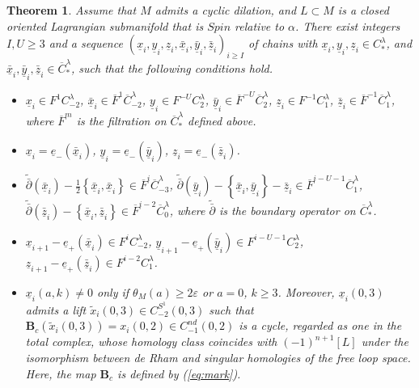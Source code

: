 \documentclass[a4paper]{article}
\newtheorem{theorem}{Theorem}
\numberwithin{equation}{section}
\begin{document}
\begin{theorem}\label{theorem:approximate}
Assume that $M$ admits a cyclic dilation, and $L\subset M$ is a closed oriented Lagrangian submanifold that is $\mathit{Spin}$ relative to $\alpha$. There exist integers $I,U\geq3$ and a sequence $(\underline{x}_i,\underline{y}_i,\underline{z}_i,\bar{\underline{x}}_i,\bar{\underline{y}}_i,\bar{\underline{z}}_i)_{i\geq I}$ of chains with $\underline{x}_i,\underline{y}_i,\underline{z}_i\in C_\ast^\lambda$, and $\bar{\underline{x}}_i,\bar{\underline{y}}_i,\bar{\underline{z}}_i\in\overline{C}_\ast^\lambda$, such that the following conditions hold.
\begin{itemize}
\item[(i)]
$\underline{x}_i\in F^1C_{-2}^\lambda$, $\bar{\underline{x}}_i\in\overline{F}^1\overline{C}_{-2}^\lambda$, $\underline{y}_i\in F^{-U}C_2^\lambda$, $\bar{\underline{y}}_i\in\overline{F}^{-U}\overline{C}_2^\lambda$, $\underline{z}_i\in F^{-1}C_1^\lambda$, $\bar{\underline{z}}_i\in\overline{F}^{-1}\overline{C}_1^\lambda$, where $\overline{F}^m$ is the filtration on $\overline{C}_\ast^\lambda$ defined above.
\item[(ii)]
$\underline{x}_i=\underline{e}_-(\bar{\underline{x}}_i)$, $\underline{y}_i=\underline{e}_-(\bar{\underline{y}}_i)$, $\underline{z}_i=\underline{e}_-(\bar{\underline{z}}_i)$.
\item[(iii)]
$\tilde{\bar{\partial}}(\bar{\underline{x}}_i)-\frac{1}{2}\left\{\bar{\underline{x}}_i,\bar{\underline{x}}_i\right\}\in \overline{F}^i\overline{C}_{-3}^\lambda$, $\tilde{\bar{\partial}}(\bar{\underline{y}}_i)-\left\{\bar{\underline{x}}_i,\bar{\underline{y}}_i\right\}-\bar{\underline{z}}_i\in \overline{F}^{i-U-1}\overline{C}_1^\lambda$, $\tilde{\bar{\partial}}(\bar{\underline{z}}_i)-\left\{\bar{\underline{x}}_i,\bar{\underline{z}}_i\right\}\in \overline{F}^{i-2}\overline{C}_0^\lambda$, where $\tilde{\bar{\partial}}$ is the boundary operator on $\overline{C}_\ast^\lambda$.
\item[(iv)]
$\underline{x}_{i+1}-\underline{e}_+(\bar{\underline{x}}_i)\in F^iC_{-2}^\lambda$, $\underline{y}_{i+1}-\underline{e}_+(\bar{\underline{y}}_i)\in F^{i-U-1}C_2^\lambda$, $\underline{z}_{i+1}-\underline{e}_+(\bar{\underline{z}}_i)\in F^{i-2}C_1^\lambda$.
\item[(v)]$\underline{x}_i(a,k)\neq0$ only if $\theta_M(a)\geq2\varepsilon$ or $a=0$, $k\geq3$. Moreover, $\underline{x}_i(0,3)$ admits a lift $\tilde{x}_i(0,3)\in C_{-2}^{S^1}(0,3)$ such that $\mathbf{B}_c\left(\tilde{x}_i(0,3)\right)=x_i(0,2)\in C_{-1}^\mathit{nd}(0,2)$ is a cycle, regarded as one in the total complex, whose homology class coincides with $(-1)^{n+1}[L]$ under the isomorphism between de Rham and singular homologies of the free loop space. Here, the map $\mathbf{B}_c$ is defined by (\ref{eq:mark}).

\end{itemize}
\end{theorem}
\end{document}
